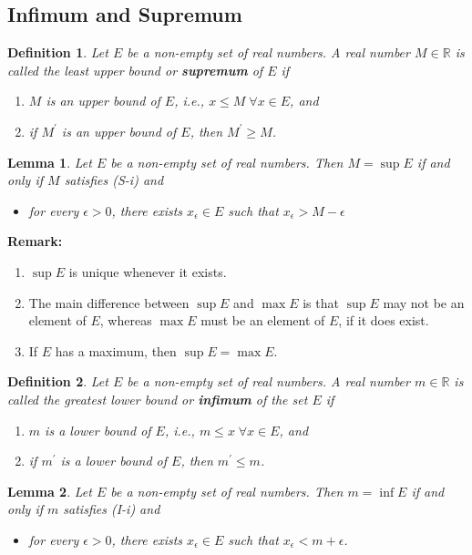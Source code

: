 \documentclass[12pt]{article}
\newtheorem{definition}{Definition}[section]
\newtheorem{lemma}{Lemma}[section]
\theoremstyle{definition}
\begin{document}
\subsection{Infimum and Supremum}
\begin{definition}\normalfont Let $E$ be a non-empty set of real numbers. A real number $M\in\mathbb{R}$ is called the least upper bound or \textbf{supremum} of $E$ if
\begin{enumerate}[label=(S-\roman*)]
\item $M$ is an upper bound of $E$, i.e., $x\leq M\;\forall x\in E$, and
\item if $M^\prime$ is an upper bound of $E$, then $M^\prime\geq M$.
\end{enumerate}
\end{definition}
\begin{lemma}\normalfont Let $E$ be a non-empty set of real numbers. Then $M=\sup E$ if and only if $M$ satisfies (S-i) and
\begin{itemize}
\item[(S-ii'] for every $\epsilon>0$, there exists $x_\epsilon\in E$ such that $x_\epsilon>M-\epsilon$
\end{itemize}
\end{lemma}
\textbf{Remark:}
\begin{enumerate}[label=(\roman*)]
\item $\sup E$ is unique whenever it exists.
\item The main difference between $\sup E$ and $\max E$ is that $\sup E$ may not be an element of $E$, whereas $\max E$ must be an element of $E$, if it does exist.
\item If $E$ has a maximum, then $\sup E = \max E$.
\end{enumerate}
\begin{definition}\normalfont Let $E$ be a non-empty set of real numbers. A real number $m\in\mathbb{R}$ is called the greatest lower bound or \textbf{infimum} of the set $E$ if
\begin{enumerate}[label=(I-\roman*)]
\item $m$ is a lower bound of $E$, i.e., $m\leq x\;\forall x\in E$, and
\item if $m^\prime$ is a lower bound of $E$, then $m^\prime\leq m$.
\end{enumerate}
\end{definition}
\begin{lemma}\normalfont Let $E$ be a non-empty set of real numbers. Then $m=\inf E$ if and only if $m$ satisfies (I-i) and 
\begin{itemize}
\item[(I-ii')] for every $\epsilon>0$, there exists $x_\epsilon\in E$ such that $x_\epsilon<m+\epsilon$.
\end{itemize}
\end{lemma}
\end{document}
